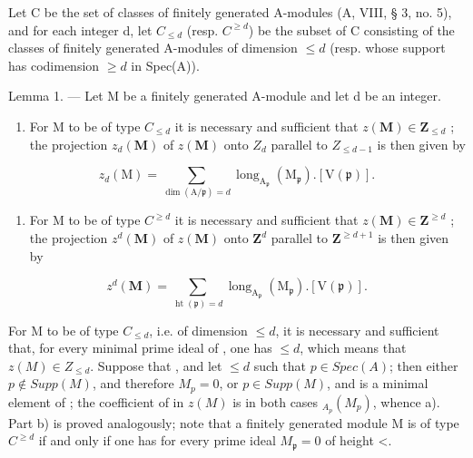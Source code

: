 Let C be the set of classes of finitely generated A-modules (A, VIII, § 3, no. 5), and for each integer d, let \(C_{\leq d}\) (resp. \(C^{\geq d}\)) be the subset of C consisting of the classes of finitely generated A-modules of dimension \(\leq d\) (resp. whose support has codimension \(\geq d\) in Spec(A)).

Lemma 1. --- Let M be a finitely generated A-module and let d be an integer.

\begin{enumerate}
\def\labelenumi{\alph{enumi})}
\tightlist
\item
  For M to be of type \(C_{\leq d}\) it is necessary and sufficient that \(z(\mathbf{M}) \in \mathbf{Z}_{\leq d}\) ; the projection \(z_{d}(\mathbf{M})\) of \(z(\mathbf{M})\) onto \(Z_{d}\) parallel to \(Z_{\leq d-1}\) is then given by
\end{enumerate}

\[
z _ {d} (\mathrm{M}) = \sum _ {\dim (\mathrm{A} / \mathfrak {p}) = d} \operatorname{long} _ {\mathrm{A} _ {\mathfrak {p}}} (\mathrm{M} _ {\mathfrak {p}}). [ \mathrm{V} (\mathfrak {p}) ].
\]

\begin{enumerate}
\def\labelenumi{\alph{enumi})}
\setcounter{enumi}{1}
\tightlist
\item
  For M to be of type \(C^{\geq d}\) it is necessary and sufficient that \(z(\mathbf{M})\in\mathbf{Z}^{\geq d}\) ; the projection \(z^{d}(\mathbf{M})\) of \(z(\mathbf{M})\) onto \(\mathbf{Z}^{d}\) parallel to \(\mathbf{Z}^{\geq d+1}\) is then given by
\end{enumerate}

\[
z ^ {d} (\mathbf {M}) = \sum _ {\operatorname{ht} (\mathfrak {p}) = d} \operatorname{long} _ {\mathrm{A} _ {\mathfrak {p}}} (\mathrm{M} _ {\mathfrak {p}}). [ \mathrm{V} (\mathfrak {p}) ].
\]

For M to be of type \(C_{\leq d}\), i.e. of dimension \(\leq d\), it is necessary and sufficient that, for every minimal prime ideal  of , one has \(\leq d\), which means that \(z(M) \in Z_{\leq d}\). Suppose that , and let \(\leq d\) such that \(p \in Spec(A)\); then either \(p \notin Supp(M)\), and therefore \(M_p = 0\), or \(p \in Supp(M)\), and { is a minimal element of }; the coefficient of {} in \(z(M)\) is in both cases \(_{A_p}(M_p)\), whence a). Part b) is proved analogously; note that a finitely generated module M is of type \(C^{\geq d}\) if and only if one has  for every prime ideal \(M_{\mathfrak{p}} = 0\) of height \textless{}.

